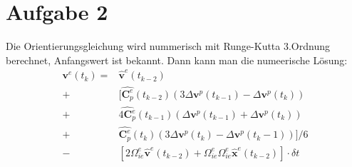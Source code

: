 \section{Aufgabe 2}
Die Orientierungsgleichung wird nummerisch mit Runge-Kutta 3.Ordnung berechnet, Anfangswert ist bekannt. Dann kann man die numeerische Lösung:
\begin{align*}
	\bm{v}^{e}(t_k) = & \hat{\bm{v}}^{e}(t_{k-2}) \\
				+ &[\hat{\bm{C}_p^{e}}(t_{k-2})(3\Delta\bm{v}^{p}(t_{k-1}) - \Delta\bm{v}^{p}(t_k))\\
				+ & \hat{4\bm{C}_p^{e}}(t_{k-1})(\Delta\bm{v}^{p}(t_{k-1}) + \Delta\bm{v}^{p}(t_k))\\
				+ & \hat{\bm{C}_p^{e}}(t_{k})(3\Delta\bm{v}^{p}(t_{k}) - \Delta\bm{v}^{p}(t_k-1))] / 6\\
				- & [2\Omega_{ie}^{e}\hat{\bm{v}}^{e}(t_{k-2}) + \Omega_{ie}^{e}\Omega_{ie}^{e}\hat{\bm{x}}^{e}(t_{k-2})] \cdot \delta t	
\end{align*}
\begin{figure}[htpb]\centering
\end{figure}
\begin{figure}[htpb]\centering
\end{figure}
